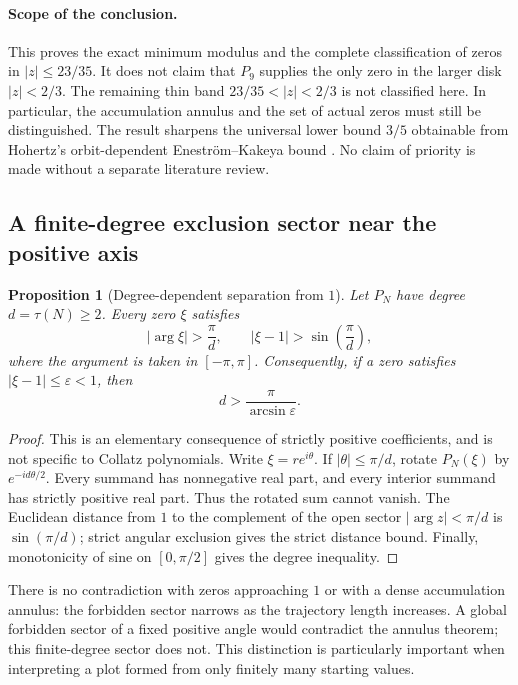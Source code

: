 \documentclass[11pt,a4paper]{article}
\newtheorem{proposition}[theorem]{Proposition}
\theoremstyle{definition}
\theoremstyle{remark}
\numberwithin{equation}{section}
\begin{document}
\paragraph{Scope of the conclusion.}
This proves the exact minimum modulus and the complete classification
of zeros in $|z|\le23/35$. It does not claim that $P_9$ supplies the only
zero in the larger disk $|z|<2/3$. The remaining thin band
$23/35<|z|<2/3$ is not classified here. In particular, the accumulation
annulus and the set of actual zeros must still be distinguished.
The result sharpens the universal lower bound $3/5$ obtainable from
Hohertz's orbit-dependent Enestr\"om--Kakeya bound
\cite{R005}. No claim of priority is made without a separate
literature review.

\subsection{A finite-degree exclusion sector near the positive axis}

\begin{proposition}[Degree-dependent separation from $1$]
\label{C:prop:degree-sector}
Let $P_N$ have degree $d=\tau(N)\ge2$. Every zero $\xi$ satisfies
\[
 |\arg\xi|>\frac{\pi}{d},
 \qquad
 |\xi-1|>\sin\!\left(\frac{\pi}{d}\right),
\]
where the argument is taken in $[-\pi,\pi]$. Consequently, if a zero
satisfies $|\xi-1|\le\varepsilon<1$, then
\[
 d>\frac{\pi}{\arcsin\varepsilon}.
\]
\end{proposition}
\begin{proof}
This is an elementary consequence of strictly positive coefficients,
and is not specific to Collatz polynomials. Write $\xi=re^{i\theta}$.
If $|\theta|\le\pi/d$, rotate $P_N(\xi)$ by $e^{-id\theta/2}$.
Every summand has nonnegative real part, and every interior summand
has strictly positive real part. Thus the rotated sum cannot vanish.
The Euclidean distance from $1$ to the complement of the open sector
$|\arg z|<\pi/d$ is $\sin(\pi/d)$; strict angular exclusion gives the
strict distance bound. Finally, monotonicity of sine on $[0,\pi/2]$
gives the degree inequality.
\end{proof}

There is no contradiction with zeros approaching $1$ or with a dense
accumulation annulus: the forbidden sector narrows as the trajectory
length increases. A global forbidden sector of a fixed positive angle
would contradict the annulus theorem; this finite-degree sector does
not. This distinction is particularly important when interpreting a
plot formed from only finitely many starting values.
\end{document}
